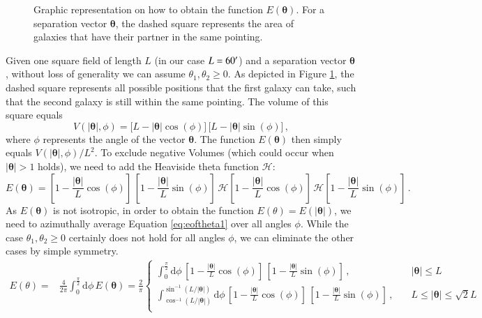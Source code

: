 \documentclass[referee]{aa} %
\renewcommand{\[}{\begin{equation}}
\renewcommand{\]}{\end{equation}}
\renewcommand{\rm}{\mathrm}
\def\inv{^{-1}}
\def\b#1{\bm{#1}}
\def\d{\rm{d}}
\begin{document}
\begin{appendix}
{
\def\vec{\b}
\begin{figure}
    \centering
    \def\svgwidth{200pt}    
    \hspace*{1cm}
      
    \hspace*{-2cm}
    \caption[Graphic how to obtain $E(\b\theta)$]{Graphic representation on how to obtain the function $E(\b\theta)$. For a separation vector $\b\theta$, the dashed square represents the area of galaxies that have their partner in the same pointing.}
    \label{fig:explain_etheta}
\end{figure}
}
Given one square field of length $L$ (in our case $L=60^\prime$) and a separation vector $\b\theta$, without loss of generality we can assume $\theta_1,\theta_2\geq 0$. As depicted in Figure \ref{fig:explain_etheta}, the dashed square represents all possible positions that the first galaxy can take, such that the second galaxy is still within the same pointing. The volume of this square equals \begin{equation}
V(|\b\theta|,\phi)  = \big[L-|\b\theta|\cos(\phi)\big]\,\big[L-|\b\theta|\sin(\phi)\big]\, ,
\end{equation} where $\phi$ represents the angle of the vector $\b\theta$. The function $E(\b\theta)$ then simply equals $V(|\b\theta|,\phi)/L^2$. To exclude negative Volumes (which could occur when $|\b\theta|>1$ holds), we need to add the Heaviside theta function $\mathcal{H}$:
\begin{equation}
E(\b\theta)  = \left[1-\frac{|\b\theta|}{L}\cos(\phi)\right]\,\left[1-\frac{|\b\theta|}{L}\sin(\phi)\right]\, \mathcal{H}\left[1-\frac{|\b\theta|}{L}\cos(\phi)\right]\,\mathcal{H}\left[1-\frac{|\b\theta|}{L}\sin(\phi)\right]\, .
\label{eq:eoftheta1}
\end{equation} 
As $E(\b\theta)$ is not isotropic, in order to obtain the function $E(\theta) = E(|\b\theta|)$, we need to azimuthally average Equation \eqref{eq:eoftheta1} over all angles $\phi$. While the case $\theta_1,\theta_2\geq 0$ certainly does not hold for all angles $\phi$, we can eliminate the other cases by simple symmetry.
\begin{align}
E(\theta) = & \frac{4}{2\pi}\int_0^{\frac{\pi}{2}}\d\phi\, E(\b\theta) = \frac{2}{\pi}\begin{cases}
\int_0^{\frac{\pi}{2}} \d\phi\, \left[1-\frac{|\b\theta|}{L}\cos(\phi)\right]\,\left[1-\frac{|\b\theta|}{L}\sin(\phi)\right]\, ,  & |\b\theta|  \leq L \\[10pt]
\int_{\cos\inv(L/|\b\theta|)}^{\sin\inv(L/|\b\theta|)} \d\phi\, \left[1-\frac{|\b\theta|}{L}\cos(\phi)\right]\,\left[1-\frac{|\b\theta|}{L}\sin(\phi)\right] \, , \quad   & L \leq |\b\theta| \leq \sqrt{2}L \\[10pt]

\end{cases}
\end{align}
\end{appendix}
\end{document}
